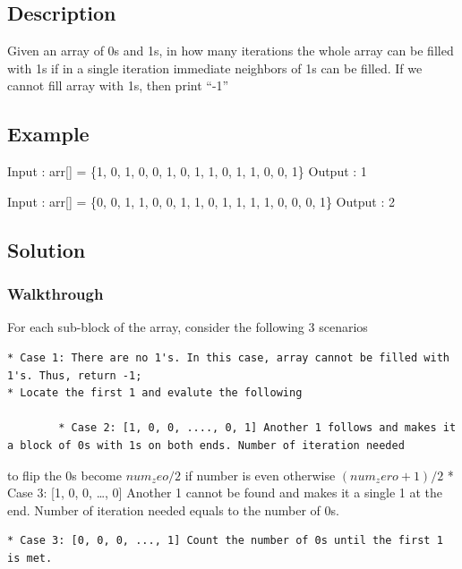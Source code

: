 \documentclass[]{book}
\begin{document}
\hypertarget{description-25}{%
\subsection{Description}\label{description-25}}

Given an array of 0s and 1s, in how many iterations the whole array can be filled with 1s if in a single iteration
immediate neighbors of 1s can be filled. If we cannot fill array with 1s, then print ``-1''

\hypertarget{example-24}{%
\subsection{Example}\label{example-24}}

Input : arr{[}{]} = \{1, 0, 1, 0, 0, 1, 0, 1, 1, 0, 1, 1, 0, 0, 1\}
Output : 1

Input : arr{[}{]} = \{0, 0, 1, 1, 0, 0, 1, 1, 0, 1, 1, 1, 1, 0, 0, 0, 1\}
Output : 2

\hypertarget{solution-19}{%
\subsection{Solution}\label{solution-19}}

\hypertarget{walkthrough-23}{%
\subsubsection{Walkthrough}\label{walkthrough-23}}

For each sub-block of the array, consider the following 3 scenarios

\begin{verbatim}
* Case 1: There are no 1's. In this case, array cannot be filled with 1's. Thus, return -1;
* Locate the first 1 and evalute the following
    
        * Case 2: [1, 0, 0, ...., 0, 1] Another 1 follows and makes it a block of 0s with 1s on both ends. Number of iteration needed
\end{verbatim}

to flip the 0s become \(num_zeo / 2\) if number is even otherwise \((num_zero + 1) / 2\)
* Case 3: {[}1, 0, 0, \ldots{}, 0{]} Another 1 cannot be found and makes it a single 1 at the end. Number of iteration needed equals
to the number of 0s.

\begin{verbatim}
* Case 3: [0, 0, 0, ..., 1] Count the number of 0s until the first 1 is met.
\end{verbatim}
\end{document}
